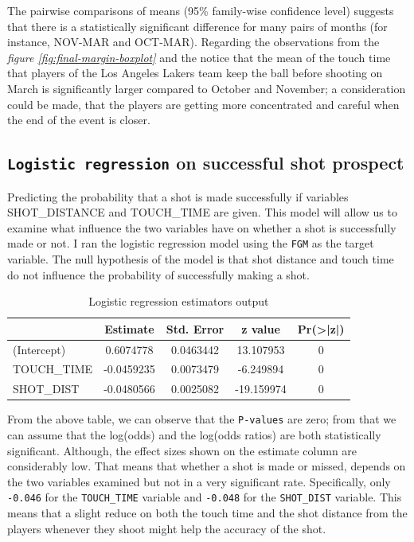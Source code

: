 \documentclass[
  11pt,
]{article}
\begin{document}
The pairwise comparisons of means (95\% family-wise confidence level) suggests that there is a statistically significant difference for many pairs of months (for instance, NOV-MAR and OCT-MAR). Regarding the observations from the \emph{figure \ref{fig:final-margin-boxplot}} and the notice that the mean of the touch time that players of the Los Angeles Lakers team keep the ball before shooting on March is significantly larger compared to October and November; a consideration could be made, that the players are getting more concentrated and careful when the end of the event is closer.

\hypertarget{logistic-regression-on-successful-shot-prospect}{%
\subsection{\texorpdfstring{\texttt{Logistic\ regression} on successful shot prospect}{Logistic regression on successful shot prospect}}\label{logistic-regression-on-successful-shot-prospect}}

Predicting the probability that a shot is made successfully if variables SHOT\_DISTANCE and TOUCH\_TIME are given. This model will allow us to examine what influence the two variables have on whether a shot is successfully made or not. I ran the logistic regression model using the \texttt{FGM} as the target variable. The null hypothesis of the model is that shot distance and touch time do not influence the probability of successfully making a shot.

\begin{table}[H]

\caption{\label{tab:logistic-reg-table}Logistic regression estimators output}
\centering
\begin{tabular}[t]{lcccc}
\toprule
  & Estimate & Std. Error & z value & Pr(>|z|)\\
\midrule
(Intercept) & 0.6074778 & 0.0463442 & 13.107953 & 0\\
TOUCH\_TIME & -0.0459235 & 0.0073479 & -6.249894 & 0\\
SHOT\_DIST & -0.0480566 & 0.0025082 & -19.159974 & 0\\
\bottomrule
\end{tabular}
\end{table}

From the above table, we can observe that the \texttt{P-values} are zero; from that we can assume that the log(odds) and the log(odds ratios) are both statistically significant. Although, the effect sizes shown on the estimate column are considerably low. That means that whether a shot is made or missed, depends on the two variables examined but not in a very significant rate. Specifically, only \texttt{-0.046} for the \texttt{TOUCH\_TIME} variable and \texttt{-0.048} for the \texttt{SHOT\_DIST} variable. This means that a slight reduce on both the touch time and the shot distance from the players whenever they shoot might help the accuracy of the shot.
\end{document}
